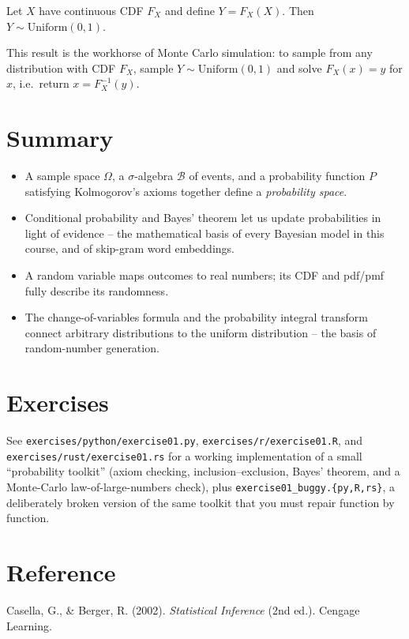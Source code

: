 \documentclass[11pt]{article}
\begin{document}
\begin{theorem}
Let $X$ have continuous CDF $F_X$ and define $Y = F_X(X)$. Then
$Y \sim \mathrm{Uniform}(0,1)$.
\end{theorem}

This result is the workhorse of Monte Carlo simulation: to sample from any
distribution with CDF $F_X$, sample $Y \sim \mathrm{Uniform}(0,1)$ and solve
$F_X(x) = y$ for $x$, i.e.\ return $x = F_X^{-1}(y)$.

\section{Summary}
\begin{summarybox}
\begin{itemize}[nosep]
  \item A sample space $\Omega$, a $\sigma$-algebra $\mathcal{B}$ of events,
        and a probability function $P$ satisfying Kolmogorov's axioms
        together define a \emph{probability space}.
  \item Conditional probability and Bayes' theorem let us update
        probabilities in light of evidence -- the mathematical basis of
        every Bayesian model in this course, and of skip-gram word
        embeddings.
  \item A random variable maps outcomes to real numbers; its CDF and
        pdf/pmf fully describe its randomness.
  \item The change-of-variables formula and the probability integral
        transform connect arbitrary distributions to the uniform
        distribution -- the basis of random-number generation.
\end{itemize}
\end{summarybox}

\section{Exercises}
See \texttt{exercises/python/exercise01.py}, \texttt{exercises/r/exercise01.R},
and \texttt{exercises/rust/exercise01.rs} for a working implementation of a
small ``probability toolkit'' (axiom checking, inclusion--exclusion, Bayes'
theorem, and a Monte-Carlo law-of-large-numbers check), plus
\texttt{exercise01\_buggy.\{py,R,rs\}}, a deliberately broken version of
the same toolkit that you must repair function by function.

\section*{Reference}
Casella, G., \& Berger, R. (2002). \emph{Statistical Inference} (2nd ed.).
Cengage Learning.
\end{document}
